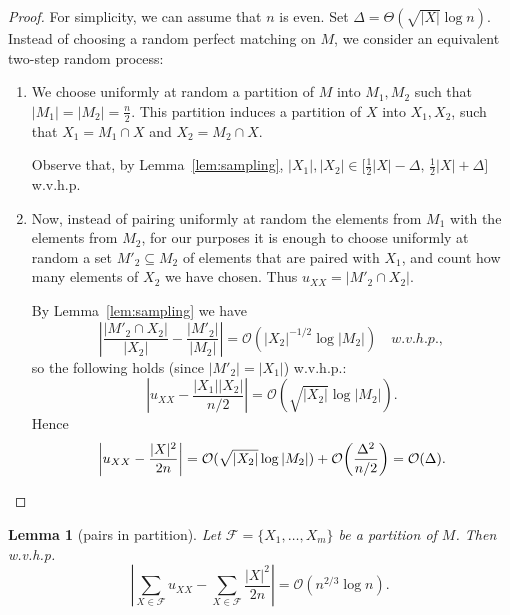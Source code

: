 \documentclass{article}[11pt,a4paper]
\newtheorem{lemma}[definition]{Lemma}
\newcommand{\bigo}{\mathcal{O}}
\begin{document}
\begin{proof}
For simplicity, we can assume that $n$ is even.
Set $\Delta = \Theta(\sqrt{|X|} \log n)$.
Instead of choosing a random perfect matching on $M$, we consider an equivalent two-step random process:
\begin{enumerate} 
\item We choose uniformly at random a partition of $M$ into $M_1,M_2$ such that $|M_1|=|M_2|=\frac{n}{2}$. This partition induces a partition of $X$ into $X_1,X_2$, such that $X_1 = M_1 \cap X$ and $X_2 = M_2 \cap X$.

Observe that, by Lemma~\ref{lem:sampling}, $|X_1|,|X_2| \in \bigl[\frac{1}{2}|X|-\Delta,\, \frac{1}{2}|X|+\Delta\bigr]$ w.v.h.p.

\item Now, instead of pairing uniformly at random the elements from $M_1$ with the elements from $M_2$, for our purposes it is enough to choose uniformly at random a set $M'_2 \subseteq M_2$ of elements that are paired with $X_1$, and count how many elements of $X_2$ we have chosen. Thus $u_{XX} = |M'_2 \cap X_2|$.

By Lemma~\ref{lem:sampling} we have
\[ \left |\frac{|M'_2 \cap X_2|}{|X_2|} - \frac{|M'_2|}{|M_2|}\right| = \bigo(|X_2|^{-1/2} \log |M_2|) \quad {w.v.h.p.},\]
so the following holds (since $|M'_2| = |X_1|$) w.v.h.p.:
\[\left|u_{XX} - \frac{|X_1||X_2|}{n/2}\right| = \bigo(\sqrt{|X_2|} \log |M_2|).\]
Hence
\[\left|u_{XX} - \frac{|X|^2}{2n}\right| = \bigo(\sqrt{|X_2|} \log |M_2|) + \bigo\biggl(\frac{\Delta^2}{n/2}\biggr) = \bigo(\Delta).\qedhere\]
\end{enumerate}
\end{proof}

\begin{lemma}[pairs in partition]
\label{lem:pairs2}
Let $\mathcal{F} = \{X_1,\ldots,X_m\}$ be a partition of $M$.  Then w.v.h.p.
\[\left|\sum_{X \in \mathcal{F}} u_{XX} - \sum_{X \in \mathcal{F}} \frac{|X|^2}{2n}\right| = \bigo(n^{2/3}\log n).\]
\end{lemma}
\end{document}
